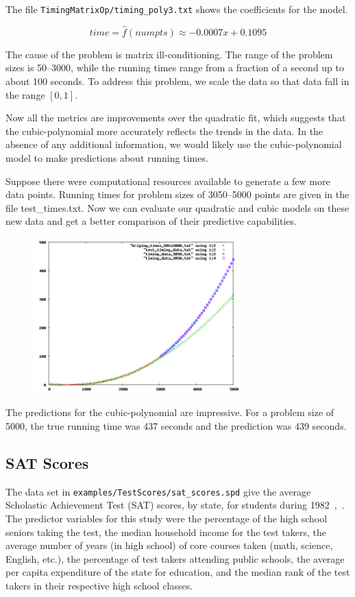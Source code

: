 \documentclass{article}
\begin{document}
The file \texttt{TimingMatrixOp/timing\_poly3.txt} shows the coefficients for the model.




\[ time = \hat{f}(numpts) \approx - 0.0007x + 0.1095 \]

The cause of the problem is matrix ill-conditioning.  The range of the problem
sizes is 50--3000, while the running times range from a fraction of a second up
to about 100 seconds.  To address this problem, we scale the data so that data
fall in the range $[0,1]$.



Now all the metrics are improvements over the quadratic fit, which suggests that
the cubic-polynomial more accurately reflects the trends in the data.  In the
absence of any additional information, we would likely use the cubic-polynomial
model to make predictions about running times.

Suppose there were computational resources available to generate a few more data
points.  Running times for problem sizes of 3050--5000 points are given in the
file test\_times.txt.  Now we can evaluate our quadratic and cubic models on
these new data and get a better comparison of their predictive capabilities.



\begin{figure}[htbp]
\centering \includegraphics[width=8cm]{TimingMatrixOp/timing_poly2_0to5000_estimates.png}
\end{figure}

The predictions for the cubic-polynomial are impressive.  For a problem size of 5000, the true running time was 437 seconds and the prediction was 439
seconds.

\pagebreak
\subsection {SAT Scores}
The data set in \texttt{examples/TestScores/sat\_scores.spd} give the average Scholastic Achievement Test (SAT) scores, by state, for students during 1982~\cite{powell},~\cite{ramsey}.  The predictor variables for this study were the percentage of the high school seniors taking the test, the median household income for the test takers, the average number of years (in high school) of core courses taken (math, science, English, etc.), the percentage of test takers attending public schools, the average per capita expenditure of the state for education, and the median rank of the test takers in their respective high school classes. 
\end{document}
